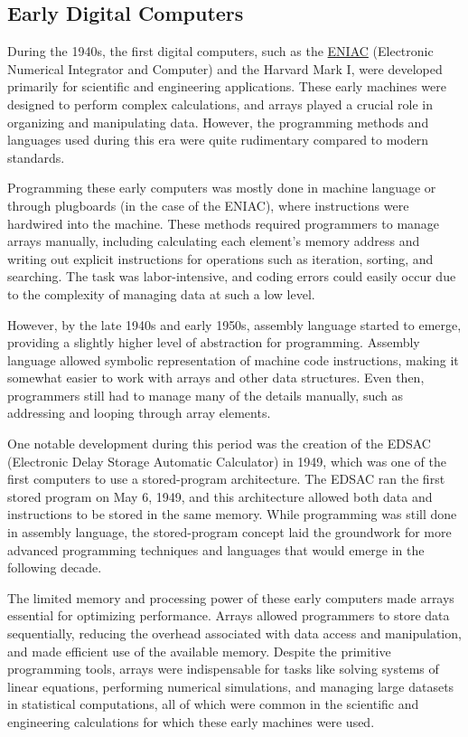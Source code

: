 \documentclass{book}
\begin{document}
	\subsection{Early Digital Computers}
	
	During the 1940s, the first digital computers, such as the \href{https://en.wikipedia.org/wiki/ENIAC}{ENIAC} (Electronic Numerical Integrator and Computer) and the Harvard Mark I, were developed primarily for scientific and engineering applications. These early machines were designed to perform complex calculations, and arrays played a crucial role in organizing and manipulating data. However, the programming methods and languages used during this era were quite rudimentary compared to modern standards.
	
	Programming these early computers was mostly done in machine language or through plugboards (in the case of the ENIAC), where instructions were hardwired into the machine. These methods required programmers to manage arrays manually, including calculating each element's memory address and writing out explicit instructions for operations such as iteration, sorting, and searching. The task was labor-intensive, and coding errors could easily occur due to the complexity of managing data at such a low level.
	
	However, by the late 1940s and early 1950s, assembly language started to emerge, providing a slightly higher level of abstraction for programming. Assembly language allowed symbolic representation of machine code instructions, making it somewhat easier to work with arrays and other data structures. Even then, programmers still had to manage many of the details manually, such as addressing and looping through array elements.
	
	One notable development during this period was the creation of the EDSAC (Electronic Delay Storage Automatic Calculator) in 1949, which was one of the first computers to use a stored-program architecture. The EDSAC ran the first stored program on May 6, 1949, and this architecture allowed both data and instructions to be stored in the same memory. While programming was still done in assembly language, the stored-program concept laid the groundwork for more advanced programming techniques and languages that would emerge in the following decade.
	
	The limited memory and processing power of these early computers made arrays essential for optimizing performance. Arrays allowed programmers to store data sequentially, reducing the overhead associated with data access and manipulation, and made efficient use of the available memory. Despite the primitive programming tools, arrays were indispensable for tasks like solving systems of linear equations, performing numerical simulations, and managing large datasets in statistical computations, all of which were common in the scientific and engineering calculations for which these early machines were used.
	
\end{document}
